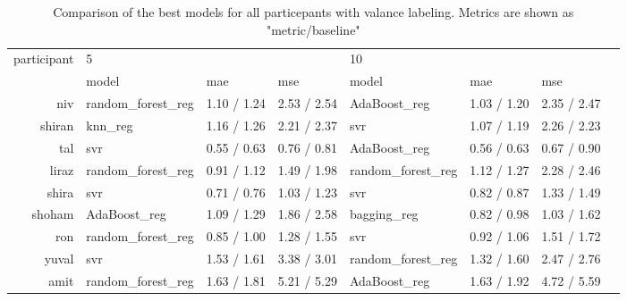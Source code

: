 \documentclass[../main.tex]{subfiles}
\begin{document}
\begin{table}[!h]
    \begin{tabular}{rlllllll}
        \toprule
        participant &  \multicolumn{3}{l}{5} & \multicolumn{3}{l}{10} \\
              &              model & mae & mse &              model & mae & mse \\
        \midrule
            niv &  random\_forest\_reg &         1.10 / 1.24 &        2.53 / 2.54 &       AdaBoost\_reg &         1.03 / 1.20 &        2.35 / 2.47 \\
         shiran &            knn\_reg &         1.16 / 1.26 &        2.21 / 2.37 &                svr &         1.07 / 1.19 &        2.26 / 2.23 \\
            tal &                svr &         0.55 / 0.63 &        0.76 / 0.81 &       AdaBoost\_reg &         0.56 / 0.63 &        0.67 / 0.90 \\
          liraz &  random\_forest\_reg &         0.91 / 1.12 &        1.49 / 1.98 &  random\_forest\_reg &         1.12 / 1.27 &        2.28 / 2.46 \\
          shira &                svr &         0.71 / 0.76 &        1.03 / 1.23 &                svr &         0.82 / 0.87 &        1.33 / 1.49 \\
         shoham &       AdaBoost\_reg &         1.09 / 1.29 &        1.86 / 2.58 &        bagging\_reg &         0.82 / 0.98 &        1.03 / 1.62 \\
            ron &  random\_forest\_reg &         0.85 / 1.00 &        1.28 / 1.55 &                svr &         0.92 / 1.06 &        1.51 / 1.72 \\
          yuval &                svr &         1.53 / 1.61 &        3.38 / 3.01 &  random\_forest\_reg &         1.32 / 1.60 &        2.47 / 2.76 \\
           amit &  random\_forest\_reg &         1.63 / 1.81 &        5.21 / 5.29 &       AdaBoost\_reg &         1.63 / 1.92 &        4.72 / 5.59 \\
        \bottomrule
    \end{tabular}        
    \caption{Comparison of the best models for all particepants with valance labeling. Metrics are shown as "metric/baseline"}
\end{table}
\end{document}
